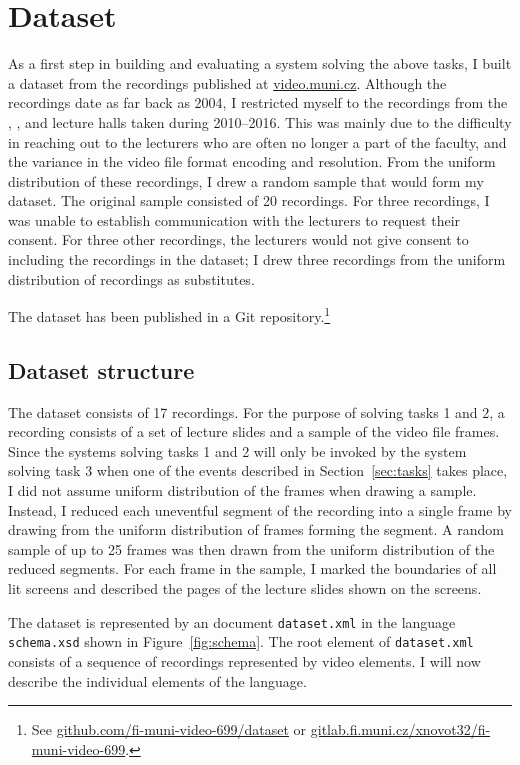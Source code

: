 \section{Dataset}
\label{sec:dataset}
As a first step in building and evaluating a system solving the above tasks, I
built a dataset from the recordings published at
\href{https://www.video.muni.cz}{video.muni.cz}.
Although the recordings date as far back as 2004, I restricted myself to the
recordings from the , , and  lecture halls taken
during 2010--2016. This was mainly due to the difficulty in reaching out to
the lecturers who are often no longer a part of the faculty, and the variance
in the video file format encoding and resolution. From the uniform distribution
of these recordings, I drew a random sample that would form my dataset.
The original sample consisted of 20 recordings. For three recordings, I was
unable to establish communication with the lecturers to request their consent.
For three other recordings, the lecturers would not give consent to including
the recordings in the dataset; I drew three recordings from the uniform
distribution of recordings as substitutes.

The dataset has been published in a Git repository.\footnote{See
  \href{https://github.com/fi-muni-video-699/dataset}%
       {github.com/fi-muni-video-699/dataset} or
  \href{https://gitlab.fi.muni.cz/xnovot32/fi-muni-video-699}%
       {gitlab.fi.muni.cz/xnovot32/fi-muni-video-699}.}

\subsection{Dataset structure}
The dataset consists of 17 recordings. For the purpose of solving tasks 1 and
2, a recording consists of a set of lecture slides and a sample of the video
file frames. Since the systems solving tasks 1 and 2 will only be invoked by
the system solving task 3 when one of the events described in
Section~\ref{sec:tasks} takes place, I did not assume uniform distribution of
the frames when drawing a sample. Instead, I reduced each uneventful segment of
the recording into a single frame by drawing from the uniform distribution of
frames forming the segment. A random sample of up to 25 frames was then drawn
from the uniform distribution of the reduced segments. For each frame in the
sample, I marked the boundaries of all lit screens and described the pages of
the lecture slides shown on the screens.

The dataset is represented by an  document \texttt{dataset.xml} in
the language \texttt{schema.xsd} shown in Figure~\ref{fig:schema}. The root
element of \texttt{dataset.xml} consists of a sequence of recordings
represented by video elements. I will now describe the individual elements of
the language.

